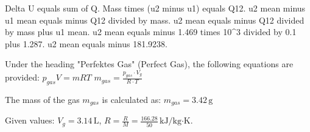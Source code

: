 Delta U equals sum of Q.  
Mass times (u2 minus u1) equals Q12.  
u2 mean minus u1 mean equals minus Q12 divided by mass.  
u2 mean equals minus Q12 divided by mass plus u1 mean.  
u2 mean equals minus 1.469 times 10^3 divided by 0.1 plus 1.287.  
u2 mean equals minus 181.9238.

Under the heading "Perfektes Gas" (Perfect Gas), the following equations are provided:  
\( p_{gas} V = m R T \)  
\( m_{gas} = \frac{p_{gas} \cdot V_g}{R \cdot T} \)  

The mass of the gas \( m_{gas} \) is calculated as:  
\( m_{gas} = 3.42 \, \text{g} \)  

Given values:  
\( V_g = 3.14 \, \text{L} \), \( R = \frac{R}{M} = \frac{166.28}{50} \, \text{kJ/kg·K} \).